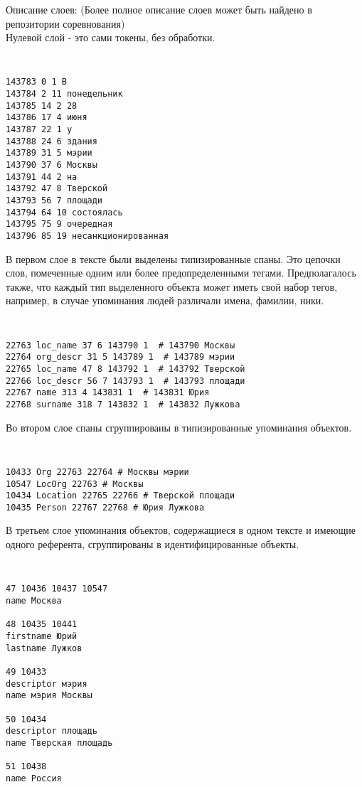 Описание слоев:
(Более полное описание слоев может быть найдено в репозитории соревнования) \\

Нулевой слой - это сами токены, без обработки.

{\tt \small
\begin{verbatim}
143783 0 1 В
143784 2 11 понедельник
143785 14 2 28
143786 17 4 июня
143787 22 1 у
143788 24 6 здания
143789 31 5 мэрии
143790 37 6 Москвы
143791 44 2 на
143792 47 8 Тверской
143793 56 7 площади
143794 64 10 состоялась
143795 75 9 очередная
143796 85 19 несанкционированная
\end{verbatim}
}

В первом слое в тексте были выделены типизированные спаны. Это цепочки слов, помеченные одним или более предопределенными тегами. Предполагалось также, что каждый тип выделенного объекта может иметь свой набор тегов, например, в случае упоминания людей различали имена, фамилии, ники. 

{\tt \small
\begin{verbatim}
22763 loc_name 37 6 143790 1  # 143790 Москвы
22764 org_descr 31 5 143789 1  # 143789 мэрии
22765 loc_name 47 8 143792 1  # 143792 Тверской
22766 loc_descr 56 7 143793 1  # 143793 площади
22767 name 313 4 143831 1  # 143831 Юрия
22768 surname 318 7 143832 1  # 143832 Лужкова
\end{verbatim}
}

Во втором слое спаны сгруппированы в типизированные упоминания объектов. 

{\tt \small
\begin{verbatim}
10433 Org 22763 22764 # Москвы мэрии
10547 LocOrg 22763 # Москвы
10434 Location 22765 22766 # Тверской площади
10435 Person 22767 22768 # Юрия Лужкова
\end{verbatim}
}

В третьем слое упоминания объектов, содержащиеся в одном тексте и имеющие одного референта, сгруппированы в идентифицированные объекты. 

{\tt \small
\begin{verbatim}
47 10436 10437 10547
name Москва

48 10435 10441
firstname Юрий
lastname Лужков

49 10433
descriptor мэрия
name мэрия Москвы

50 10434
descriptor площадь
name Тверская площадь

51 10438
name Россия
\end{verbatim}
}

